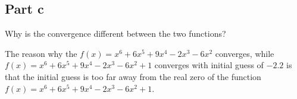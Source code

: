 \subsection{Part c}

\begin{question}
    Why is the convergence different between the two functions?
\end{question}

\begin{answer}
    The reason why the $f(x) = x^6+6x^5+9x^4-2x^3-6x^2$ converges, while $f(x) = x^6+6x^5+9x^4-2x^3-6x^2 + 1$ converges with initial guess of $-2.2$ is that the initial guess is too far away from the real zero of the function $f(x) = x^6+6x^5+9x^4-2x^3-6x^2 + 1$.
\end{answer}